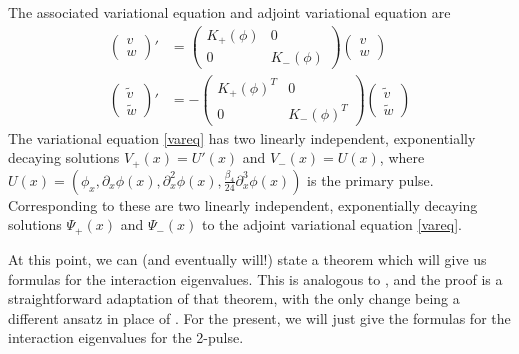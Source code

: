 \documentclass[12pt]{article}
\begin{document}
The associated variational equation and adjoint variational equation are
\begin{align}
\begin{pmatrix}v \\ w\end{pmatrix}' &=
\begin{pmatrix}K_+(\phi) & 0 \\ 0 & K_-(\phi) \end{pmatrix}
\begin{pmatrix}v \\ w\end{pmatrix} \label{vareq} \\
\begin{pmatrix}\tilde{v} \\ \tilde{w}\end{pmatrix}' &=
-\begin{pmatrix}K_+(\phi)^T & 0 \\ 0 & K_-(\phi)^T \end{pmatrix}
\begin{pmatrix}\tilde{v} \\ \tilde{w}\end{pmatrix} \label{adjvareq}
\end{align}
The variational equation \cref{vareq} has two linearly independent, exponentially decaying solutions $V_+(x) = U'(x)$ and $V_-(x) = U(x)$, where $U(x) = (\phi_x, \partial_x \phi(x), \partial_x^2 \phi(x), \frac{\beta_4}{24} \partial_x^3 \phi(x))$ is the primary pulse. Corresponding to these are two linearly independent, exponentially decaying solutions $\Psi_+(x)$ and $\Psi_-(x)$ to the adjoint variational equation \cref{vareq}. 

At this point, we can (and eventually will!) state a theorem which will give us formulas for the interaction eigenvalues. This is analogous to \cite[Theorem 2]{Sandstede1998}, and the proof is a straightforward adaptation of that theorem, with the only change being a different ansatz in place of \cite[(3.5)]{Sandstede1998}. For the present, we will just give the formulas for the interaction eigenvalues for the 2-pulse.
\end{document}
